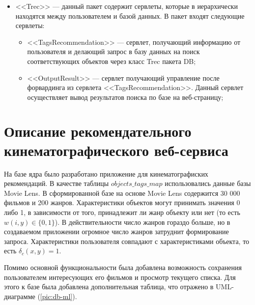 \begin{itemize}
\begin{itemize}
		  \end{itemize}
	  \item <<Trec>> --- данный пакет содержит сервлеты, которые в
		  иерархически
		  находятся между пользователем и базой данных.
		  В пакет входят следующие сервлеты:
		  \begin{itemize}
			  \item <<TagsRecommendation>> --- сервлет, получающий информацию от пользователя и делающий запрос в базу данных
				  на поиск соответствующих объектов через класс Trec пакета DB;
			  \item <<OutputResult>> --- сервлет получающий управление после форвардинга из сервлета <<TagsRecommendation>>. Данный сервлет осуществляет
				  вывод результатов поиска по базе на веб-страницу;
		  \end{itemize}
\end{itemize}

\section{Описание рекомендательного кинематографического веб-сервиса}
На базе ядра было разработано приложение для кинематографиских рекомендаций.
В качестве таблицы $objects\_tags\_map$ использовались данные базы Movie Lens.
В сформированной базе на основе Movie Lens содержится 30 000 фильмов и 200 жанров.
Характеристики объектов могут принимать значения 0 либо 1, в зависимости от того,
принадлежит ли жанр объекту или нет (то есть $w(i, y) \in \{0,1\}$).
В действительности число жанров гораздо больше, но в создаваемом приложении огромное число 
жанров затруднит формирование запроса. Характеристики пользователя совпадают с
характеристиками объекта, то есть $\delta_c(x, y) = 1$.

Помимо основной функциональности была добавлена возможность сохранения пользователем
интересующих его фильмов и просмотр текущего списка. Для этого к базе была
добавлена
дополнительная таблица, что отражено в UML-диаграмме (\ref{pic:db-ml}).

